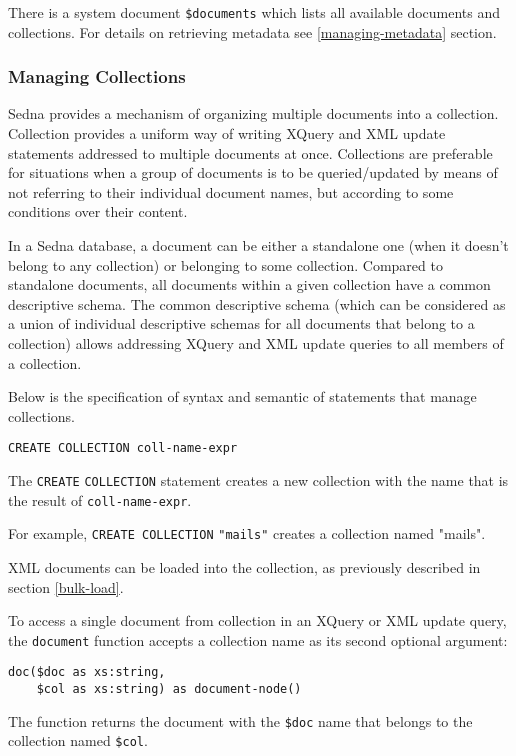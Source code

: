 \documentclass[a4paper,12pt]{article}
\begin{document}
There is a system document \verb!$documents! which lists all available documents
and collections. For details on retrieving metadata see \ref{managing-metadata}
section.


\subsubsection{Managing Collections}

Sedna provides a mechanism of organizing multiple documents into a collection.
Collection provides a uniform way of writing XQuery and XML update statements
addressed to multiple documents at once. Collections are preferable for
situations when a group of documents is to be queried/updated by means of not
referring to their individual document names, but according to some conditions
over their content.

In a Sedna database, a document can be either a standalone one (when it doesn't
belong to any collection) or belonging to some collection. Compared to
standalone documents, all documents within a given collection have a common
descriptive schema. The common descriptive schema (which can be considered as a
union of individual descriptive schemas for all documents that belong to a
collection) allows addressing XQuery and XML update queries to all members of a
collection.

Below is the specification of syntax and semantic of statements that manage
collections.

\begin{verbatim}
CREATE COLLECTION coll-name-expr
\end{verbatim}

The \verb!CREATE! \verb!COLLECTION! statement creates a new collection with the
name that is the result of \verb!coll-name-expr!.

For example, \verb!CREATE COLLECTION! \verb!"mails"! creates a collection named
"mails".

XML documents can be loaded into the collection, as previously described in
section \ref{bulk-load}.

To access a single document from collection in an XQuery or XML update query,
the \verb!document! function accepts a collection name as its second optional
argument:
\begin{verbatim}
doc($doc as xs:string,
    $col as xs:string) as document-node()
\end{verbatim}
The function returns the document with the \verb!$doc! name that belongs to the
collection named \verb!$col!.
\end{document}
